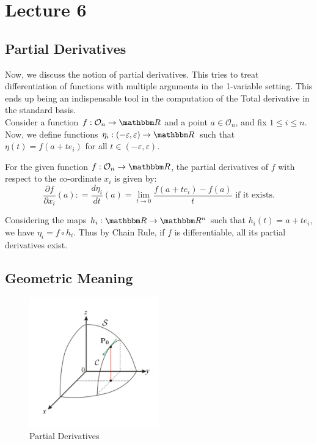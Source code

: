 \documentclass[../Analysis-3]{subfiles}
\begin{document}
\chapter*{Lecture 6} %
\setcounter{chapter}{6} %



\section{Partial Derivatives}

Now, we discuss the notion of partial derivatives. This tries to treat differentiation of functions with multiple arguments in the 1-variable setting. This ends up being an indispensable tool in the computation of the Total derivative in the standard basis.\\[0.2 cm]

Consider a function $f:\mathcal{O}_n \rightarrow\R$ and a point $a \in \mathcal{O}_n$, and fix $1 \leq i \leq n$. Now, we define functions $\eta_i : (-\varepsilon, \varepsilon) \rightarrow \R$ such that $\eta(t) = f(a + te_i)$ for all $t \in (-\varepsilon, \varepsilon)$.

\begin{Def}{}{}
    For the given function $f:\mathcal{O}_n \rightarrow\R$, the partial derivatives of $f$ with respect to the co-ordinate $x_i$ is given by:
    \[
        \frac{\partial f}{\partial x_i}(a) \mathrel{\mathop:}=  \frac{d\eta_i}{dt}(a) = \lim_{t \to 0} \frac{f(a+te_i) - f(a)}{t} \text{ if it exists.}
    \]
\end{Def}

Considering the maps $h_i : \R \to \R^n$ such that $h_i(t) = a + te_i$, we have $\eta_i = f \circ h_i$. Thus by Chain Rule, if $f$ is differentiable, all its partial derivatives exist.
  
\section{Geometric Meaning}

\begin{figure}
    \centering
    \includegraphics[width=0.5\textwidth]{figures/lec6.1.png}
    \caption{Partial Derivatives}
    \label{fig1:6}
\end{figure}
\end{document}
